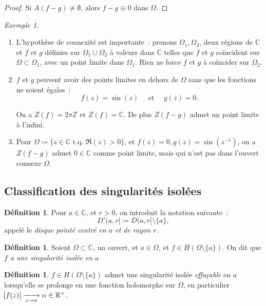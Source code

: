 \documentclass{report}
\theoremstyle{definition}
\newtheorem{déf}[thm]{Définition}
\theoremstyle{remark}
\newtheorem{ex}{Exemple}[chapter]
\numberwithin{equation}{section}
\newcommand{\C}{\mathbb C}
\newcommand{\R}{\mathbb R}
\newcommand{\Z}{\mathbb Z}
\newcommand{\tq}{\text{ t.q. }}
\begin{document}
			\begin{proof} Si $A(f-g) \neq \emptyset$, alors $f-g \equiv 0$ dans $\Omega$.
			\end{proof}

			\begin{ex}~
			\begin{enumerate}
				\item L'hypothèse de connexité est importante~: prenons $\Omega_1, \Omega_2$, deux régions de $\C$ et $f$ et $g$ définies sur $\Omega_1 \cup \Omega_2$
				à valeurs dans $\C$ telles que $f$ et $g$ coïncident sur $\Omega \subset \Omega_1$, avec un point limite dans $\Omega_1$. Rien ne force $f$ et $g$ à
				coïncider sur $\Omega_2$.
				\item $f$ et $g$ peuvent avoir des points limites en dehors de $\Omega$ sans que les fonctions ne soient égales~:
				\begin{equation}
					f(z) = \sin(z) \quad \text{ et } \quad g(z) = 0.
				\end{equation}

				On a $Z(f) = 2\pi\Z$ et $Z(f) = \C$. De plus $Z(f-g)$ admet un point limite à l'infini.
				\item Pour $\Omega \coloneqq \{z \in \C \tq \Re(z) > 0\}$, et $f(z) = 0, g(z) = \sin(z^{-1})$, on a $Z(f-g)$ admet $0 \in \C$ comme point limite, mais qui
				n'est pas dans l'ouvert connexe $\Omega$.
			\end{enumerate}
			\end{ex}

		\subsection{Classification des singularités isolées}
			\begin{déf}
				Pour $a \in \C$, et $r > 0$, on introduit la notation suivante~:
				\begin{equation}
					D'(a, r[ \coloneqq D(a, r[ \setminus \{a\},
				\end{equation}
				appelé le \textit{disque pointé centré en $a$ et de rayon $r$}.
			\end{déf}

			\begin{déf} Soient $\Omega \subset \C$, un ouvert, et $a \in \Omega$, et $f \in H(\Omega \setminus \{a\})$. On dit que
			\textit{$f$ a une singularité isolée en $a$}
			\end{déf}

			\begin{déf} $f \in H(\Omega \setminus \{a\})$ admet une singularité isolée \textit{effaçable} en $a$ lorsqu'elle se prolonge en une fonction holomorphe
			sur $\Omega$, en particulier $\abs {f(z)} \xrightarrow[z \to a]{} \alpha \in \R^+$.
			\end{déf}
\end{document}

